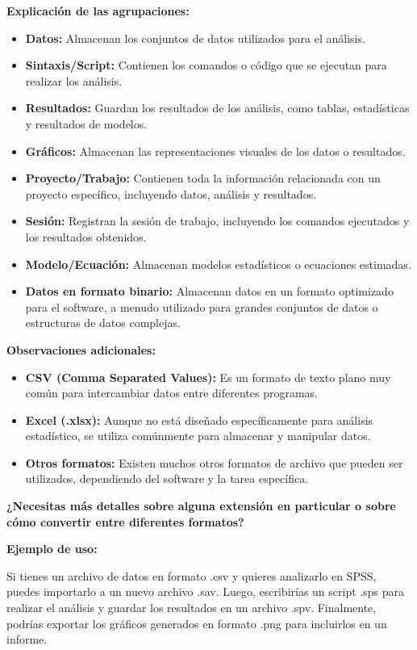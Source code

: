 \documentclass[
  stu,
  floatsintext,
  longtable,
  a4paper,
  nolmodern,
  notxfonts,
  notimes,
  12pt,
  colorlinks=true,linkcolor=blue,citecolor=blue,urlcolor=blue]{apa7}
\providecommand{\tightlist}{%
  \setlength{\itemsep}{0pt}\setlength{\parskip}{0pt}}
\begin{document}
\textbf{Explicación de las agrupaciones:}

\begin{itemize}
\tightlist
\item
  \textbf{Datos:} Almacenan los conjuntos de datos utilizados para el
  análisis.
\item
  \textbf{Sintaxis/Script:} Contienen los comandos o código que se
  ejecutan para realizar los análisis.
\item
  \textbf{Resultados:} Guardan los resultados de los análisis, como
  tablas, estadísticas y resultados de modelos.
\item
  \textbf{Gráficos:} Almacenan las representaciones visuales de los
  datos o resultados.
\item
  \textbf{Proyecto/Trabajo:} Contienen toda la información relacionada
  con un proyecto específico, incluyendo datos, análisis y resultados.
\item
  \textbf{Sesión:} Registran la sesión de trabajo, incluyendo los
  comandos ejecutados y los resultados obtenidos.
\item
  \textbf{Modelo/Ecuación:} Almacenan modelos estadísticos o ecuaciones
  estimadas.
\item
  \textbf{Datos en formato binario:} Almacenan datos en un formato
  optimizado para el software, a menudo utilizado para grandes conjuntos
  de datos o estructuras de datos complejas.
\end{itemize}

\textbf{Observaciones adicionales:}

\begin{itemize}
\tightlist
\item
  \textbf{CSV (Comma Separated Values):} Es un formato de texto plano
  muy común para intercambiar datos entre diferentes programas.
\item
  \textbf{Excel (.xlsx):} Aunque no está diseñado específicamente para
  análisis estadístico, se utiliza comúnmente para almacenar y manipular
  datos.
\item
  \textbf{Otros formatos:} Existen muchos otros formatos de archivo que
  pueden ser utilizados, dependiendo del software y la tarea específica.
\end{itemize}

\textbf{¿Necesitas más detalles sobre alguna extensión en particular o
sobre cómo convertir entre diferentes formatos?}

\textbf{Ejemplo de uso:}

Si tienes un archivo de datos en formato .csv y quieres analizarlo en
SPSS, puedes importarlo a un nuevo archivo .sav. Luego, escribirías un
script .sps para realizar el análisis y guardar los resultados en un
archivo .spv. Finalmente, podrías exportar los gráficos generados en
formato .png para incluirlos en un informe.
\end{document}
